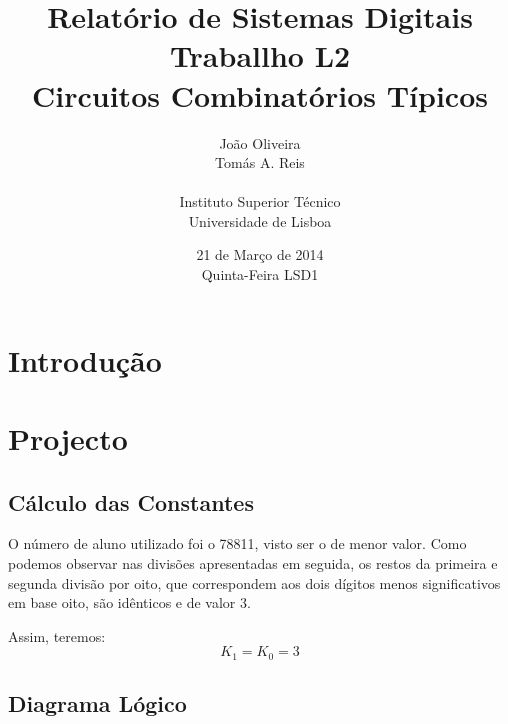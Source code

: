 \documentclass[a4paper,12pt]{article}
\begin{document}
\renewcommand{\sfdefault}{lmss}
\renewcommand{\familydefault}{\sfdefault}
\selectfont

\title{\bf Relatório de Sistemas Digitais \\
Traballho L2\\
Circuitos Combinatórios Típicos}
\author{João Oliveira\\
Tomás A. Reis\\
\\
Instituto Superior Técnico \\
Universidade de Lisboa}
\date{21 de Março de 2014 \\
Quinta-Feira LSD1}
\maketitle

\pagebreak
\section{Introdução}

\section{Projecto}
\subsection{Cálculo das Constantes}
O número de aluno utilizado foi o 78811, visto ser o de menor valor. Como podemos observar nas divisões apresentadas em seguida, os restos da primeira e segunda divisão por oito, que correspondem aos dois dígitos menos significativos em base oito, são idênticos e de valor 3. 
\par
\vspace*{1\baselineskip}
\:\:\:\:\:\: 
\vspace*{1\baselineskip}
\par
Assim, teremos:
\begin{equation}
K_1=K_0=3
\end{equation}
\subsection{Diagrama Lógico}
\end{document}
